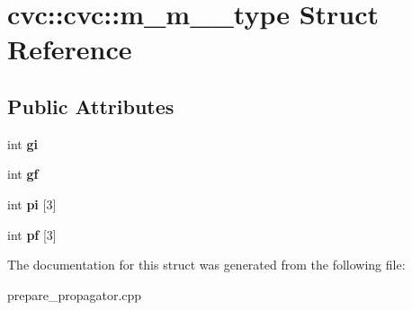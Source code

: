 \hypertarget{structcvc_1_1cvc_1_1m__m__2pt__type}{\section{cvc\-:\-:cvc\-:\-:m\-\_\-m\-\_\-2pt\-\_\-type Struct Reference}
\label{structcvc_1_1cvc_1_1m__m__2pt__type}
}
\subsection*{Public Attributes}
\begin{DoxyCompactItemize}
\item 
\hypertarget{structcvc_1_1cvc_1_1m__m__2pt__type_a617575fcf4c00f9dbc59fe623049bce3}{int {\bfseries gi}}\label{structcvc_1_1cvc_1_1m__m__2pt__type_a617575fcf4c00f9dbc59fe623049bce3}

\item 
\hypertarget{structcvc_1_1cvc_1_1m__m__2pt__type_acba8e2e420d3311db7080b8703fc29b7}{int {\bfseries gf}}\label{structcvc_1_1cvc_1_1m__m__2pt__type_acba8e2e420d3311db7080b8703fc29b7}

\item 
\hypertarget{structcvc_1_1cvc_1_1m__m__2pt__type_a9e76ba4943df83af925872cd528db759}{int {\bfseries pi} \mbox{[}3\mbox{]}}\label{structcvc_1_1cvc_1_1m__m__2pt__type_a9e76ba4943df83af925872cd528db759}

\item 
\hypertarget{structcvc_1_1cvc_1_1m__m__2pt__type_adf933b9de5b7d9011c4911a161bb20db}{int {\bfseries pf} \mbox{[}3\mbox{]}}\label{structcvc_1_1cvc_1_1m__m__2pt__type_adf933b9de5b7d9011c4911a161bb20db}

\end{DoxyCompactItemize}


The documentation for this struct was generated from the following file\-:\begin{DoxyCompactItemize}
\item 
prepare\-\_\-propagator.\-cpp\end{DoxyCompactItemize}
